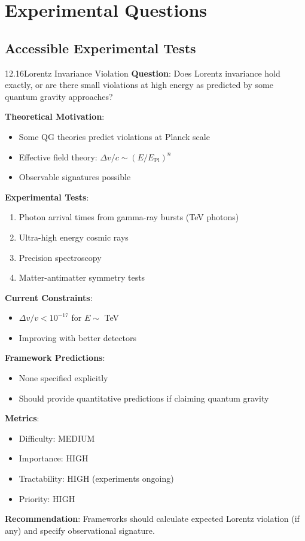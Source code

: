 \section{Experimental Questions}

\subsection{Accessible Experimental Tests}

\begin{openproblem}{12.16}{Lorentz Invariance Violation}
\textbf{Question}: Does Lorentz invariance hold exactly, or are there small violations at high energy as predicted by some quantum gravity approaches?

\textbf{Theoretical Motivation}:
\begin{itemize}
    \item Some QG theories predict violations at Planck scale
    \item Effective field theory: $\Delta v/c \sim (E/E_{\text{Pl}})^n$
    \item Observable signatures possible
\end{itemize}

\textbf{Experimental Tests}:
\begin{enumerate}
    \item Photon arrival times from gamma-ray bursts (TeV photons)
    \item Ultra-high energy cosmic rays
    \item Precision spectroscopy
    \item Matter-antimatter symmetry tests
\end{enumerate}

\textbf{Current Constraints}:
\begin{itemize}
    \item $\Delta v/v < 10^{-17}$ for $E \sim$ TeV
    \item Improving with better detectors
\end{itemize}

\textbf{Framework Predictions}:
\begin{itemize}
    \item None specified explicitly
    \item Should provide quantitative predictions if claiming quantum gravity
\end{itemize}

\textbf{Metrics}:
\begin{itemize}
    \item Difficulty: MEDIUM
    \item Importance: HIGH
    \item Tractability: HIGH (experiments ongoing)
    \item Priority: HIGH
\end{itemize}

\textbf{Recommendation}: Frameworks should calculate expected Lorentz violation (if any) and specify observational signature.
\end{openproblem}


